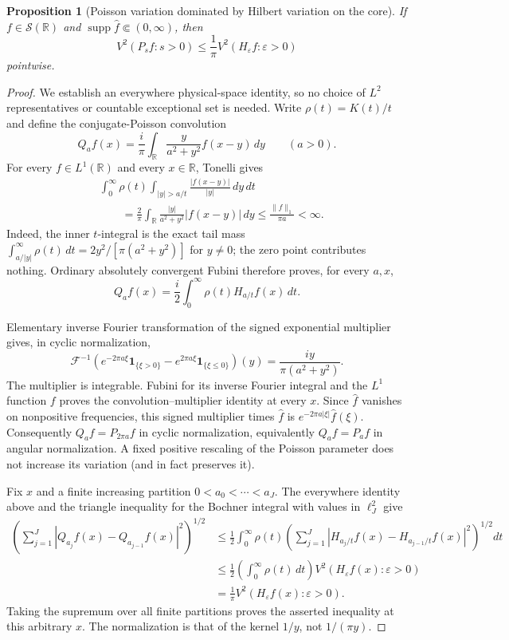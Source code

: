\documentclass[11pt]{article}
\numberwithin{equation}{section}
\newtheorem{proposition}[theorem]{Proposition}
\theoremstyle{remark}
\theoremstyle{definition}
\begin{document}
\begin{proposition}[Poisson variation dominated by Hilbert variation on the core]
\label{prop:poisson-by-hilbert}
If $f\in\mathcal S(\mathbb R)$ and
$\operatorname{supp}\widehat f\Subset(0,\infty)$, then
\begin{equation}\label{eq:poisson-by-hilbert}
 V^2(P_sf:s>0)
 \le\frac1\pi V^2(H_\varepsilon f:\varepsilon>0)
\end{equation}
pointwise.
\end{proposition}

\begin{proof}
We establish an everywhere physical-space identity, so no choice of
$L^2$ representatives or countable exceptional set is needed.  Write
$\rho(t)=K(t)/t$ and define the conjugate-Poisson convolution
\[
 Q_af(x)=\frac i\pi\int_{\mathbb R}\frac{y}{a^2+y^2}f(x-y)\,dy
 \qquad(a>0).
\]
For every $f\in L^1(\mathbb R)$ and every $x\in\mathbb R$, Tonelli gives
\begin{align*}
 &\int_0^\infty\rho(t)\int_{|y|>a/t}\frac{|f(x-y)|}{|y|}\,dy\,dt\\
 &\qquad=\frac2\pi\int_{\mathbb R}
       \frac{|y|}{a^2+y^2}|f(x-y)|\,dy
 \le\frac{\|f\|_1}{\pi a}<\infty.
\end{align*}
Indeed, the inner $t$-integral is the exact tail mass
$\int_{a/|y|}^\infty\rho(t)\,dt
 =2y^2/[\pi(a^2+y^2)]$ for $y\ne0$; the zero point contributes
nothing.  Ordinary absolutely convergent Fubini therefore proves,
for every $a,x$,
\[
 Q_af(x)=\frac i2\int_0^\infty\rho(t)H_{a/t}f(x)\,dt.
\]

Elementary inverse Fourier transformation of the signed exponential
multiplier gives, in cyclic normalization,
\[
 \mathcal F^{-1}\!\left(
 e^{-2\pi a\xi}\mathbf1_{\{\xi>0\}}
 -e^{2\pi a\xi}\mathbf1_{\{\xi\le0\}}\right)(y)
 =\frac{iy}{\pi(a^2+y^2)}.
\]
The multiplier is integrable.  Fubini for its inverse Fourier integral
and the $L^1$ function $f$ proves the convolution--multiplier identity
at every $x$.  Since $\widehat f$ vanishes on nonpositive frequencies,
this signed multiplier times $\widehat f$ is
$e^{-2\pi a|\xi|}\widehat f(\xi)$.  Consequently
$Q_af=P_{2\pi a}f$ in cyclic normalization, equivalently $Q_af=P_af$
in angular normalization.  A fixed positive rescaling of the Poisson
parameter does not increase its variation (and in fact preserves it).

Fix $x$ and a finite increasing partition $0<a_0<\cdots<a_J$.
The everywhere identity above and the triangle inequality for the
Bochner integral with values in $\ell^2_J$ give
\begin{align*}
 \left(\sum_{j=1}^J|Q_{a_j}f(x)-Q_{a_{j-1}}f(x)|^2\right)^{1/2}
 &\le\frac12\int_0^\infty\rho(t)
 \left(\sum_{j=1}^J|H_{a_j/t}f(x)-H_{a_{j-1}/t}f(x)|^2\right)^{1/2}dt\\
 &\le\frac12\left(\int_0^\infty\rho(t)\,dt\right)
       V^2(H_\varepsilon f(x):\varepsilon>0)\\
 &=\frac1\pi V^2(H_\varepsilon f(x):\varepsilon>0).
\end{align*}
Taking the supremum over all finite partitions proves the asserted
inequality at this arbitrary $x$.  The normalization is that of the
kernel $1/y$, not $1/(\pi y)$.
\end{proof}
\end{document}
